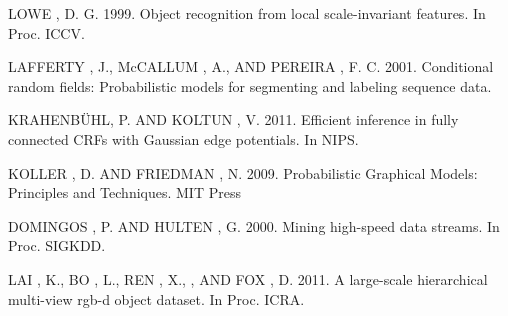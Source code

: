 \documentclass{llncs}
\begin{document}
\begin{thebibliography}{1}
  LOWE , D. G. 1999. Object recognition from local scale-invariant features. In Proc. ICCV.
  
  LAFFERTY , J., McCALLUM , A., AND PEREIRA , F. C. 2001. Conditional random fields: Probabilistic models for segmenting and labeling sequence data.
  
  KRAHENBÜHL, P. AND KOLTUN , V. 2011. Efficient inference in fully connected CRFs with Gaussian edge potentials. In NIPS.

  KOLLER , D. AND FRIEDMAN , N. 2009. Probabilistic Graphical Models: Principles and Techniques. MIT Press
  
  DOMINGOS , P. AND HULTEN , G. 2000. Mining high-speed data streams. In Proc. SIGKDD.
	
  LAI , K., BO , L., REN , X., , AND FOX , D. 2011. A large-scale hierarchical multi-view rgb-d object dataset. In Proc. ICRA.


\end{thebibliography}
\end{document}
